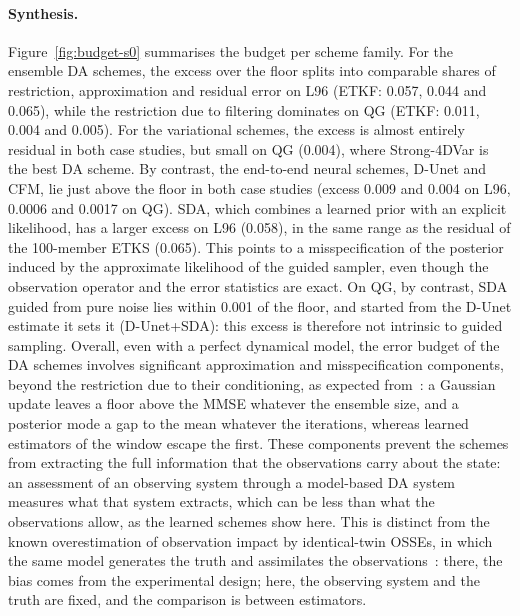 \paragraph{Synthesis.}
Figure~\ref{fig:budget-s0} summarises the budget per scheme family. For the ensemble
DA schemes, the excess over the floor splits into comparable shares of restriction,
approximation and residual error on L96 (ETKF: 0.057, 0.044 and 0.065), while the
restriction due to filtering dominates on QG (ETKF: 0.011, 0.004 and 0.005). For the
variational schemes, the excess is almost entirely residual in both case studies, but
small on QG (0.004), where Strong-4DVar is the best DA scheme. By contrast, the end-to-end neural schemes,
D-Unet and CFM, lie just above the floor in both case studies (excess 0.009 and 0.004
on L96, 0.0006 and 0.0017 on QG). SDA, which combines a learned prior with an explicit
likelihood, has a larger excess on L96 (0.058), in the same range as the residual
of the 100-member ETKS (0.065). This points to a misspecification of the
posterior induced by the approximate likelihood of the guided sampler, even though the
observation operator and the error statistics are exact. On QG, by contrast, SDA guided
from pure noise lies within 0.001 of the floor, and started from the D-Unet estimate it
sets it (D-Unet+SDA): this excess is therefore not intrinsic to guided sampling. Overall, even with a perfect dynamical model, the error
budget of the DA schemes involves significant approximation and misspecification
components, beyond the restriction due to their conditioning, as expected
from~\cite{fablet_not_2026}: a Gaussian update leaves a floor above the MMSE whatever the
ensemble size, and a posterior mode a gap to the mean whatever the iterations, whereas learned
estimators of the window escape the first. These components prevent
the schemes from extracting the full information that the observations carry about
the state: an assessment of an observing system through a model-based DA system measures what
that system extracts, which can be less than what the observations allow, as the learned
schemes show here. This is distinct from the known overestimation of observation impact by
identical-twin OSSEs, in which the same model generates the truth and assimilates the
observations~\cite{halliwell_rigorous_2014,yu_evaluation_2019}: there, the bias comes from the experimental design; here, the observing system and
the truth are fixed, and the comparison is between estimators.



